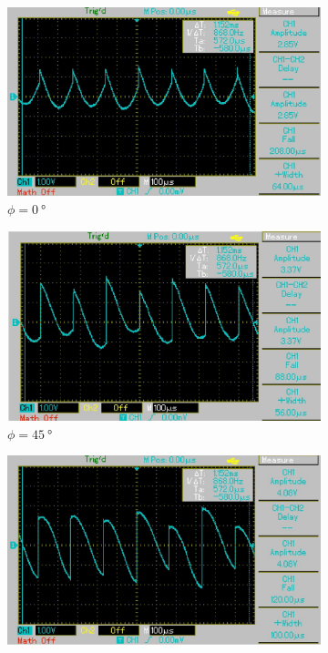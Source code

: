 \begin{figure}[H]
  \centering
  \begin{subfigure}{0.3\textwidth}
      \centering
      \includegraphics[width=\textwidth]{build/0.jpg}
      \caption{$\phi = \SI{0}{\degree}$}
  \end{subfigure}
  \begin{subfigure}{0.3\textwidth}
    \centering
    \includegraphics[width=\textwidth]{build/45.jpg}
    \caption{$\phi = \SI{45}{\degree}$}
  \end{subfigure}
  \begin{subfigure}{0.3\textwidth}
    \centering
    \includegraphics[width=\textwidth]{build/90.jpg}

\end{subfigure}
\end{figure}
